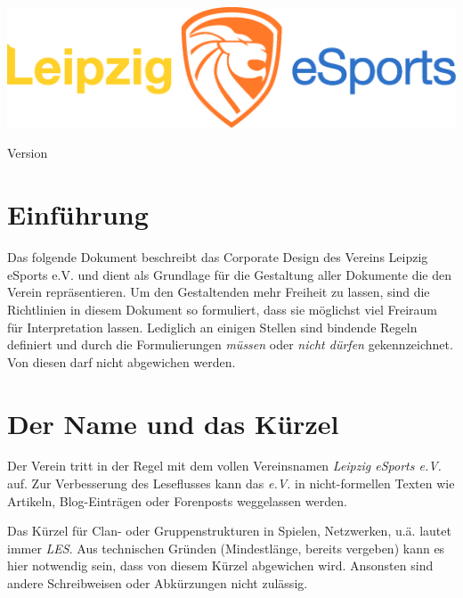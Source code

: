 \documentclass{article}
\begin{document}
\begin{titlepage}
\vspace*{\fill}
\title{\titel}
\author{\autor}
\includegraphics[width=\textwidth]{Docs/Logo.eps}
{\let\newpage\relax\maketitle}
\begin{center}
Version \version
\end{center}
\vspace*{\fill}
\end{titlepage}

\cleardoublepage

\tableofcontents

\cleardoublepage
\section{Einführung}

Das folgende Dokument beschreibt das Corporate Design des Vereins Leipzig eSports e.V. und dient als Grundlage für die Gestaltung aller Dokumente die den Verein repräsentieren. Um den Gestaltenden mehr Freiheit zu lassen, sind die Richtlinien in diesem Dokument so formuliert, dass sie möglichst viel Freiraum für Interpretation lassen. Lediglich an einigen Stellen sind bindende Regeln definiert und durch die Formulierungen \emph{müssen} oder \emph{nicht dürfen} gekennzeichnet. Von diesen darf nicht abgewichen werden.

\cleardoublepage
\section{Der Name und das Kürzel}

Der Verein tritt in der Regel mit dem vollen Vereinsnamen \emph{Leipzig eSports e.V.} auf. Zur Verbesserung des Leseflusses kann das \emph{e.V.} in nicht-formellen Texten wie Artikeln, Blog-Einträgen oder Forenposts weggelassen werden.

Das Kürzel für Clan- oder Gruppenstrukturen in Spielen, Netzwerken, u.ä. lautet immer \emph{LES}. Aus technischen Gründen (Mindestlänge, bereits vergeben) kann es hier notwendig sein, dass von diesem Kürzel abgewichen wird. Ansonsten sind andere Schreibweisen oder Abkürzungen nicht zulässig.
\end{document}
